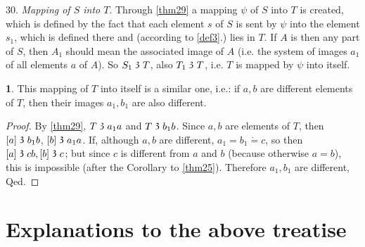 \documentclass[leqno,hidelinks,a4paper]{article}
\theoremstyle{definition}
\newtheorem{satz}{\protect\satzname}
\newcommand{\satzname}{}
\renewcommand{\satzname}{\hspace{-4pt}.\ Satz}%
\renewcommand{\satzname}{\hspace{-4pt}.\ Theorem}%
\newcommand\partof{\mathrel{\raisebox{0.45ex}{$\mathfrak{3}$}}}
\begin{document}
30. \emph{Mapping of $S$ into $T$}. Through \ref{thm29} a mapping $\psi$ of $S$ into $T$ is created, which is defined by the fact that each element $s$ of $S$ is sent by $\psi$ into the element $s_1$, which is defined there and (according to \ref{def3}.) lies in $T$.
If $A$ is then any part of $S$, then $A_1$ should mean the associated image of $A$ (i.e. the system of images $a_1$ of all elements $a$ of $A$). So $S_1 \partof T$, also $T_1 \partof T$, i.e. $T$ is mapped by $\psi$ into itself.

\begin{satz}\label{thm31}
This mapping of $T$ into itself is a similar one, i.e.: if $a, b$ are different elements of $T$, then their images $a_1, b_1$ are also different.
\end{satz}

\begin{proof}
By \ref{thm29}, $T \partof a_1a$ and $T \partof b_1b$. Since $a, b$ are elements of $T$, then $[a] \partof b_1b$, $[b] \partof a_1a$. If, although $a, b$ are different, $a_1 = b_1  \dot{=}
c$, so then $[a] \partof cb, [b] \partof c$; but since $c$ is different from $a$ and $b$ (because otherwise $a=b$), this is impossible (after the Corollary to \ref{thm25}). Therefore $a_1, b_1$ are different, Qed.
\end{proof}

\section*{Explanations to the above treatise}
\end{document}
